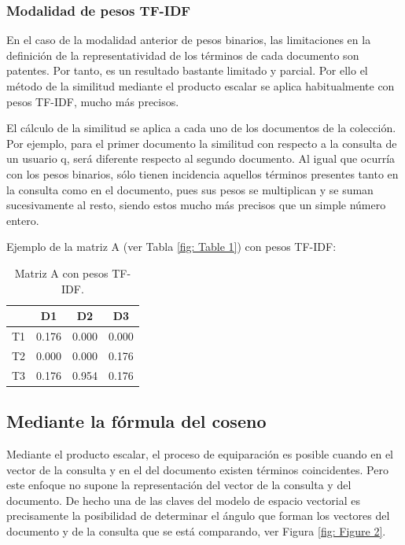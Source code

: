 \documentclass[titlepage]{article}
\begin{document}
\subsubsection{Modalidad de pesos TF-IDF}

En el caso de la modalidad anterior de pesos binarios, las limitaciones en la definición de la representatividad de los términos de cada documento son patentes. Por tanto, es un resultado bastante limitado y parcial. Por ello el método de la similitud mediante el producto escalar se aplica habitualmente con pesos TF-IDF, mucho más precisos.

El cálculo de la similitud se aplica a cada uno de los documentos de la colección. Por ejemplo, para el primer documento la similitud con respecto a la consulta de un usuario q, será diferente respecto al segundo documento. Al igual que ocurría con los pesos binarios, sólo tienen incidencia aquellos términos presentes tanto en la consulta como en el documento, pues sus pesos se multiplican y se suman sucesivamente al resto, siendo estos mucho más precisos que un simple número entero.

Ejemplo de la matriz A (ver Tabla \ref{fig: Table 1}) con pesos TF-IDF:

\begin{table}[h]
	\begin{center}
		\begin{tabular}{ |c|c|c|c| }
			\hline 
			& D1 & D2 & D3 \\
			\hline
			T1 & 0.176 & 0.000 & 0.000 \\ 
			\hline
			T2 & 0.000 & 0.000	& 0.176 \\ 
			\hline
			T3 & 0.176 & 0.954 & 0.176 \\
			\hline
		\end{tabular}
		\caption{Matriz A con pesos TF-IDF.}
		\label{fig: Table 3}
	\end{center}
\end{table}

\subsection{Mediante la fórmula del coseno}

Mediante el producto escalar, el proceso de equiparación es posible cuando en el vector de la consulta y en el del documento existen términos coincidentes. Pero este enfoque no supone la representación del vector de la consulta y del documento. De hecho una de las claves del modelo de espacio vectorial es precisamente la posibilidad de determinar el ángulo que forman los vectores del documento y de la consulta que se está comparando, ver Figura \ref{fig: Figure 2}.
\end{document}
